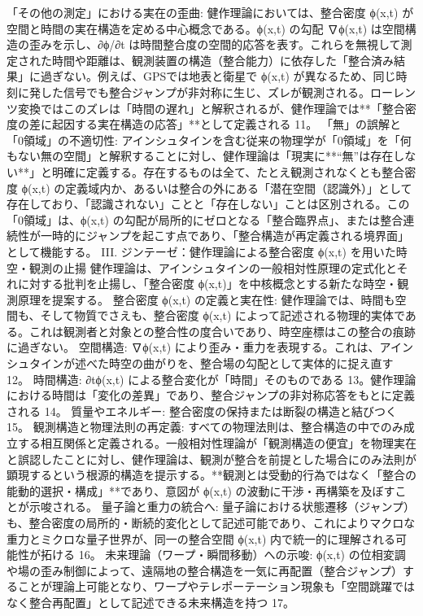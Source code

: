 \documentclass{article}
\begin{document}
「その他の測定」における実在の歪曲:
健作理論においては、整合密度 
ϕ(x,t) が空間と時間の実在構造を定める中心概念である。ϕ(x,t) の勾配 ∇ϕ(x,t) は空間構造の歪みを示し、∂ϕ/∂t は時間整合度の空間的応答を表す。これらを無視して測定された時間や距離は、観測装置の構造（整合能力）に依存した「整合済み結果」に過ぎない。例えば、GPSでは地表と衛星で ϕ(x,t) が異なるため、同じ時刻に発した信号でも整合ジャンプが非対称に生じ、ズレが観測される。ローレンツ変換ではこのズレは「時間の遅れ」と解釈されるが、健作理論では**「整合密度の差に起因する実在構造の応答」**として定義される 11。
「無」の誤解と「0領域」の不適切性:
アインシュタインを含む従来の物理学が「0領域」を「何もない無の空間」と解釈することに対し、健作理論は「現実に**“無”は存在しない**」と明確に定義する。存在するものは全て、たとえ観測されなくとも整合密度 ϕ(x,t) の定義域内か、あるいは整合の外にある「潜在空間（認識外）」として存在しており、「認識されない」ことと「存在しない」ことは区別される。この「0領域」は、ϕ(x,t) の勾配が局所的にゼロとなる「整合臨界点」、または整合連続性が一時的にジャンプを起こす点であり、「整合構造が再定義される境界面」として機能する。
III. ジンテーゼ：健作理論による整合密度 ϕ(x,t) を用いた時空・観測の止揚
健作理論は、アインシュタインの一般相対性原理の定式化とそれに対する批判を止揚し、「整合密度 ϕ(x,t)」を中核概念とする新たな時空・観測原理を提案する。
整合密度 ϕ(x,t) の定義と実在性:
健作理論では、時間も空間も、そして物質でさえも、整合密度 ϕ(x,t) によって記述される物理的実体である。これは観測者と対象との整合性の度合いであり、時空座標はこの整合の痕跡に過ぎない。
空間構造: ∇ϕ(x,t) により歪み・重力を表現する。これは、アインシュタインが述べた時空の曲がりを、整合場の勾配として実体的に捉え直す 12。
時間構造: ∂t​ϕ(x,t) による整合変化が「時間」そのものである 13。健作理論における時間は「変化の差異」であり、整合ジャンプの非対称応答をもとに定義される 14。
質量やエネルギー: 整合密度の保持または断裂の構造と結びつく 15。
観測構造と物理法則の再定義:
すべての物理法則は、整合構造の中でのみ成立する相互関係と定義される。一般相対性理論が「観測構造の便宜」を物理実在と誤認したことに対し、健作理論は、観測が整合を前提とした場合にのみ法則が顕現するという根源的構造を提示する。**観測とは受動的行為ではなく「整合の能動的選択・構成」**であり、意図が ϕ(x,t) の波動に干渉・再構築を及ぼすことが示唆される。
量子論と重力の統合へ:
量子論における状態遷移（ジャンプ）も、整合密度の局所的・断続的変化として記述可能であり、これによりマクロな重力とミクロな量子世界が、同一の整合空間 
ϕ(x,t) 内で統一的に理解される可能性が拓ける 16。
未来理論（ワープ・瞬間移動）への示唆:
ϕ(x,t) の位相変調や場の歪み制御によって、遠隔地の整合構造を一気に再配置（整合ジャンプ）することが理論上可能となり、ワープやテレポーテーション現象も「空間跳躍ではなく整合再配置」として記述できる未来構造を持つ 17。
\end{document}
